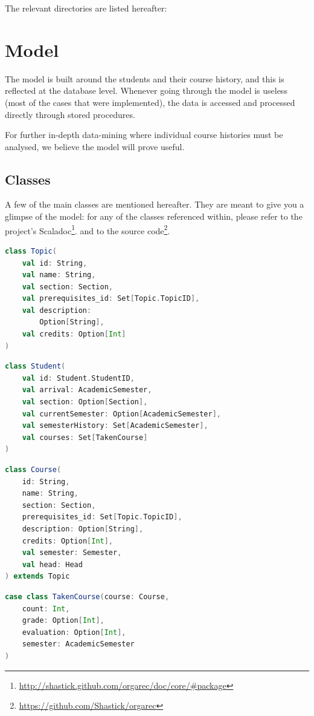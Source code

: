 The relevant directories are listed hereafter:


\chapter{Model}
The model is built around the students and their course history, and this is reflected at the database level. Whenever going through the model is useless (most of the cases that were implemented), the data is accessed and processed directly through stored procedures.

For further in-depth data-mining where individual course histories must be analysed, we believe the model will prove useful.

\section{Classes}
A few of the main classes are mentioned hereafter. They are meant to give you a glimpse of the model: for any of the classes referenced within, please refer to the project's Scaladoc\footnote{\url{http://shastick.github.com/orgarec/doc/core/\#package}}.
and to the source code\footnote{\url{https://github.com/Shastick/orgarec}}.
\begin{multicols}{2}
\begin{lstlisting}[language=Scala]
class Topic(
    val id: String,
    val name: String,
    val section: Section,
    val prerequisites_id: Set[Topic.TopicID],
    val description: 
    	Option[String],
    val credits: Option[Int]
)
\end{lstlisting}

\begin{lstlisting}[language=Scala]
class Student(
    val id: Student.StudentID,
    val arrival: AcademicSemester,
    val section: Option[Section],
    val currentSemester: Option[AcademicSemester],
    val semesterHistory: Set[AcademicSemester],
    val courses: Set[TakenCourse]   
)
\end{lstlisting}

\columnbreak
\begin{lstlisting}[language=Scala]
class Course(
    id: String,
    name: String,
    section: Section,
    prerequisites_id: Set[Topic.TopicID],
    description: Option[String],
    credits: Option[Int],
    val semester: Semester,
    val head: Head
) extends Topic
\end{lstlisting}
\begin{lstlisting}[language=Scala]
case class TakenCourse(course: Course,
    count: Int,
    grade: Option[Int],
    evaluation: Option[Int],
    semester: AcademicSemester
)
\end{lstlisting}

\end{multicols}


